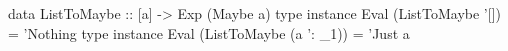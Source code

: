 \begin{code}
data ListToMaybe :: [a] -> Exp (Maybe a)
type instance Eval (ListToMaybe '[])       = 'Nothing
type instance Eval (ListToMaybe (a ': _1)) = 'Just a
\end{code}
